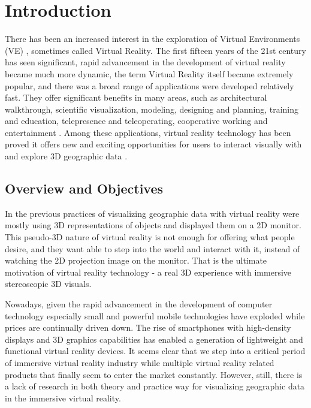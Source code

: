 \label{chapter-introduction}
\chapter{Introduction}

There has been an increased interest in the exploration of Virtual Environments (VE) \cite{huang.java-cgi-vr.2002}, sometimes called Virtual Reality. The first fifteen years of the 21st century has seen significant, rapid advancement in the development of virtual reality became much more dynamic, the term Virtual Reality itself became extremely popular, and there was a broad range of applications were developed relatively fast. They offer significant benefits in many areas, such as architectural walkthrough, scientific visualization, modeling, designing and planning, training and education, telepresence and teleoperating, cooperative working and entertainment \cite{mazuryk.vr.1996}. Among these applications, virtual reality technology has been proved it offers new and exciting opportunities for users to interact visually with and explore 3D geographic data \cite{huang.java-cgi-vr.2002}. 

\section{Overview and Objectives}

In the previous practices of visualizing geographic data with virtual reality were mostly using 3D representations of objects and displayed them on a 2D monitor. This pseudo-3D nature of virtual reality is not enough for offering what people desire, and they want able to step into the world and interact with it, instead of watching the 2D projection image on the monitor. That is the ultimate motivation of virtual reality technology - a real 3D experience with immersive stereoscopic 3D visuals.

Nowadays, given the rapid advancement in the development of computer technology especially small and powerful mobile technologies have exploded while prices are continually driven down. The rise of smartphones with high-density displays and 3D graphics capabilities has enabled a generation of lightweight and functional virtual reality devices. It seems clear that we step into a critical period of immersive virtual reality industry while multiple virtual reality related products that finally seem to enter the market constantly. However, still, there is a lack of research in both theory and practice way for visualizing geographic data in the immersive virtual reality. 

